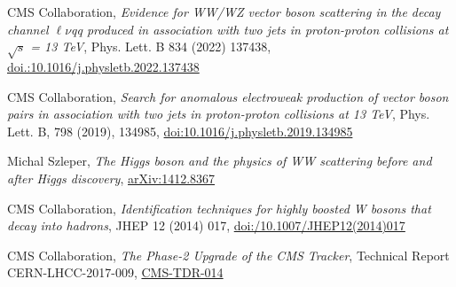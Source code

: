 {\begin{flushleft}
 



\end{flushleft}

\begin{thebibliography}{9}
\bibitem{[1]}
CMS Collaboration, {\em Evidence for WW/WZ vector boson scattering in the decay channel $\ell\nu$qq produced in association with two jets in proton-proton collisions at $\sqrt{s}$ = 13 TeV}, Phys. Lett. B 834 (2022) 137438, \href{https://doi.org/10.1016/j.physletb.2022.137438}{doi.:10.1016/j.physletb.2022.137438}

\bibitem{[2]}
CMS Collaboration, {\em Search for anomalous electroweak production of vector boson pairs in association with two jets in proton-proton collisions at 13 TeV}, Phys. Lett. B, 798 (2019), 134985, \href{https://doi.org/10.1016/j.physletb.2019.134985}{doi:10.1016/j.physletb.2019.134985}

\bibitem{[3]}
Michal Szleper, {\em The Higgs boson and the physics of WW scattering before and after Higgs discovery}, \href{https://arxiv.org/pdf/1412.8367}{arXiv:1412.8367}


\bibitem{[4]}
CMS Collaboration, {\em Identification techniques for highly boosted W bosons that decay into hadrons}, JHEP 12 (2014) 017, \href{https://link.springer.com/article/10.1007/JHEP12(2014)017}{doi:/10.1007/JHEP12(2014)017}

\bibitem{[5]}
CMS Collaboration, {\em The Phase-2 Upgrade of the CMS Tracker}, Technical Report CERN-LHCC-2017-009, \href{https://cds.cern.ch/record/2272264?ln=en}{CMS-TDR-014}

\end{thebibliography}
}
